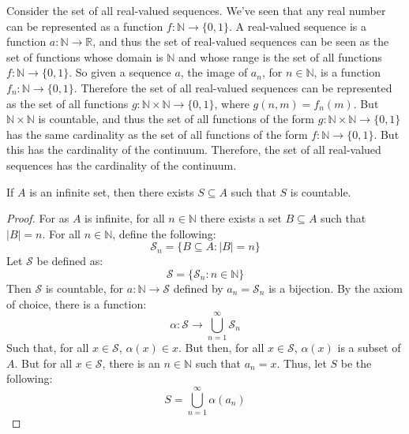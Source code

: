         \begin{lexample}
            Consider the set of all real-valued sequences. We've seen
            that any real number can be represented as a function
            $f:\mathbb{N}\rightarrow\{0,1\}$. A real-valued sequence
            is a function $a:\mathbb{N}\rightarrow\mathbb{R}$, and
            thus the set of real-valued sequences can be seen as the
            set of functions whose domain is $\mathbb{N}$ and whose
            range is the set of all functions
            $f:\mathbb{N}\rightarrow\{0,1\}$. So given a sequence
            $a$, the image of $a_{n}$, for $n\in\mathbb{N}$, is a
            function $f_{n}:\mathbb{N}\rightarrow\{0,1\}$. Therefore
            the set of all real-valued sequences can be represented
            as the set of all functions
            $g:\mathbb{N}\times\mathbb{N}\rightarrow\{0,1\}$, where
            $g(n,m)=f_{n}(m)$. But $\mathbb{N}\times\mathbb{N}$ is
            countable, and thus the set of all functions of the form
            $g:\mathbb{N}\times\mathbb{N}\rightarrow\{0,1\}$ has the
            same cardinality as the set of all functions of the form
            $f:\mathbb{N}\rightarrow\{0,1\}$. But this has the
            cardinality of the continuum. Therefore, the set of all
            real-valued sequences has the cardinality of the continuum.
        \end{lexample}
        \begin{theorem}
            If $A$ is an infinite set, then there exists $S\subseteq{A}$ such that
            $S$ is countable.
        \end{theorem}
        \begin{proof}
            For as $A$ is infinite, for all $n\in\mathbb{N}$
            there exists a set $B\subseteq{A}$ such that
            $|B|=n$. For all $n\in\mathbb{N}$,
            define the following:
            \begin{equation}
                \mathcal{S}_{n}=\{B\subseteq{A}:|B|=n\}
            \end{equation}
            Let $\mathcal{S}$ be defined as:
            \begin{equation}
                \mathcal{S}=\{\mathcal{S}_{n}:n\in\mathbb{N}\}
            \end{equation}
            Then $\mathcal{S}$ is countable, for
            $a:\mathbb{N}\rightarrow\mathcal{S}$ defined
            by $a_{n}=\mathcal{S}_{n}$ is a bijection.
            By the axiom of choice, there is a function:
            \begin{equation}
                \alpha:\mathcal{S}\rightarrow
                \bigcup_{n=1}^{\infty}\mathcal{S}_{n}
            \end{equation}
            Such that, for all $x\in\mathcal{S}$,
            $\alpha(x)\in{x}$. But then, for all
            $x\in\mathcal{S}$, $\alpha(x)$ is a subset
            of $A$. But for all $x\in\mathcal{S}$, there
            is an $n\in\mathbb{N}$ such that
            $a_{n}=x$. Thus, let $S$ be the following:
            \begin{equation}
                S=\bigcup_{n=1}^{\infty}\alpha(a_{n})
            \end{equation}
        \end{proof}
